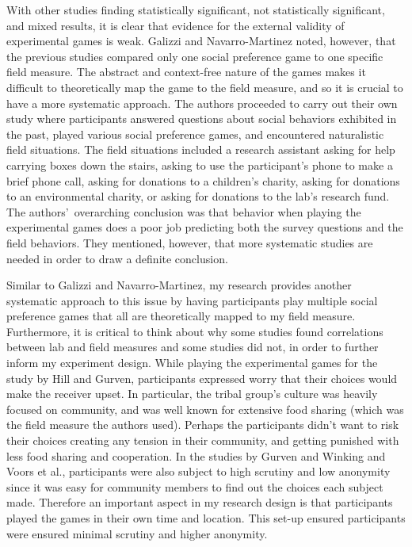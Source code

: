 \documentclass[12pt]{article}
\begin{document}
With other studies finding statistically significant, not statistically significant, and mixed results, it is clear that evidence for the external validity of experimental games is weak. Galizzi and Navarro-Martinez noted, however, that the previous studies compared only one social preference game to one specific field measure. The abstract and context-free nature of the games makes it difficult to theoretically map the game to the field measure, and so it is crucial to have a more systematic approach. The authors proceeded to carry out their own study where participants answered questions about social behaviors exhibited in the past, played various social preference games, and encountered naturalistic field situations. The field situations included a research assistant asking for help carrying boxes down the stairs, asking to use the participant\rq s phone to make a brief phone call, asking for donations to a children\rq s charity, asking for donations to an environmental charity, or asking for donations to the lab\rq s research fund.  The authors\rq \ overarching conclusion was that behavior when playing the experimental games does a poor job predicting both the survey questions and the field behaviors. They mentioned, however, that more systematic studies are needed in order to draw a definite conclusion.

Similar to Galizzi and Navarro-Martinez, my research provides another systematic approach to this issue by having participants play multiple social preference games that all are theoretically mapped to my field measure. Furthermore, it is critical to think about why some studies found correlations between lab and field measures and some studies did not, in order to further inform my experiment design. While playing the experimental games for the study by Hill and Gurven, participants expressed worry that their choices would make the receiver upset. In particular, the tribal group\rq s culture was heavily focused on community, and was well known for extensive food sharing (which was the field measure the authors used). Perhaps the participants didn\rq t want to risk their choices creating any tension in their community, and getting punished with less food sharing and cooperation. In the studies by Gurven and Winking and Voors et al., participants were also subject to high scrutiny and low anonymity since it was easy for community members to find out the choices each subject made. Therefore an important aspect in my research design is that participants played the games in their own time and location. This set-up ensured participants were ensured minimal scrutiny and higher anonymity. 
\end{document}
